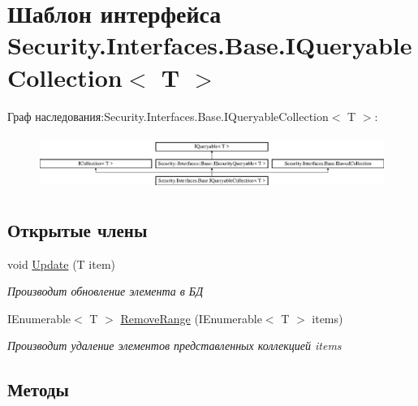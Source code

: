 \hypertarget{interface_security_1_1_interfaces_1_1_base_1_1_i_queryable_collection}{}\section{Шаблон интерфейса Security.\+Interfaces.\+Base.\+I\+Queryable\+Collection$<$ T $>$}
\label{interface_security_1_1_interfaces_1_1_base_1_1_i_queryable_collection}
Граф наследования\+:Security.\+Interfaces.\+Base.\+I\+Queryable\+Collection$<$ T $>$\+:\begin{figure}[H]
\begin{center}
\leavevmode
\includegraphics[height=1.789137cm]{d9/dcc/interface_security_1_1_interfaces_1_1_base_1_1_i_queryable_collection}
\end{center}
\end{figure}
\subsection*{Открытые члены}
\begin{DoxyCompactItemize}
\item 
void \hyperlink{interface_security_1_1_interfaces_1_1_base_1_1_i_queryable_collection_aed78963fa30c2273533e170055d43729}{Update} (T item)
\begin{DoxyCompactList}\small\item\em Производит обновление элемента в БД \end{DoxyCompactList}\item 
I\+Enumerable$<$ T $>$ \hyperlink{interface_security_1_1_interfaces_1_1_base_1_1_i_queryable_collection_a265f8228eaea97a1765c00a46627783d}{Remove\+Range} (I\+Enumerable$<$ T $>$ items)
\begin{DoxyCompactList}\small\item\em Производит удаление элементов представленных коллекцией items \end{DoxyCompactList}\end{DoxyCompactItemize}


\subsection{Методы}
\mbox{\label{interface_security_1_1_interfaces_1_1_base_1_1_i_queryable_collection_a265f8228eaea97a1765c00a46627783d}} 
